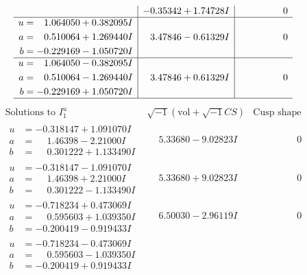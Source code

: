 \documentclass[1p]{elsarticle_modified}
\theoremstyle{definition}
\newcommand{\I}{\sqrt{-1}}
\begin{document}
$$\begin{array}{c|c|c}
 & -0.35342 + 1.74728 I & \phantom{-0.000000 } 0 \\ \hline\begin{aligned}
u &= \phantom{-}1.064050 + 0.382095 I \\
a &= \phantom{-}0.510064 + 1.269440 I \\
b &= -0.229169 - 1.050720 I\end{aligned}
 & \phantom{-}3.47846 - 0.61329 I & \phantom{-0.000000 } 0 \\ \hline\begin{aligned}
u &= \phantom{-}1.064050 - 0.382095 I \\
a &= \phantom{-}0.510064 - 1.269440 I \\
b &= -0.229169 + 1.050720 I\end{aligned}
 & \phantom{-}3.47846 + 0.61329 I & \phantom{-0.000000 } 0\\
 \hline 
 \end{array}$$\newpage$$\begin{array}{c|c|c}  
\text{Solutions to }I^u_{1}& \I (\text{vol} + \sqrt{-1}CS) & \text{Cusp shape}\\
 \hline 
\begin{aligned}
u &= -0.318147 + 1.091070 I \\
a &= \phantom{-}1.46398 - 2.21000 I \\
b &= \phantom{-}0.301222 + 1.133490 I\end{aligned}
 & \phantom{-}5.33680 - 9.02823 I & \phantom{-0.000000 } 0 \\ \hline\begin{aligned}
u &= -0.318147 - 1.091070 I \\
a &= \phantom{-}1.46398 + 2.21000 I \\
b &= \phantom{-}0.301222 - 1.133490 I\end{aligned}
 & \phantom{-}5.33680 + 9.02823 I & \phantom{-0.000000 } 0 \\ \hline\begin{aligned}
u &= -0.718234 + 0.473069 I \\
a &= \phantom{-}0.595603 + 1.039350 I \\
b &= -0.200419 - 0.919433 I\end{aligned}
 & \phantom{-}6.50030 - 2.96119 I & \phantom{-0.000000 } 0 \\ \hline\begin{aligned}
u &= -0.718234 - 0.473069 I \\
a &= \phantom{-}0.595603 - 1.039350 I \\
b &= -0.200419 + 0.919433 I\end{aligned}

\end{array}$$
\end{document}
